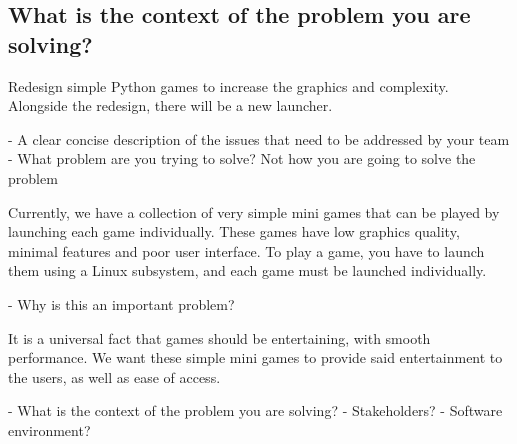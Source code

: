 \documentclass{article}
\begin{document}
\subsection{What is the context of the problem you are solving?}

Redesign simple Python games to increase the graphics and complexity.
Alongside the redesign, there will be a new launcher. 

- A clear concise description of the issues that need to be addressed by your team
- What problem are you trying to solve? Not how you are going to solve the problem

Currently, we have a collection of very simple mini games that can be played by launching each game individually. These games have 
low graphics quality, minimal features and poor user interface. To play a game, you have to launch them using a Linux subsystem, and each
game must be launched individually.

- Why is this an important problem?

It is a universal fact that games should be entertaining, with smooth performance. We want these simple mini games to provide said
entertainment to the users, as well as ease of access.

- What is the context of the problem you are solving?
	- Stakeholders?
	- Software environment?
	





\end{document}
